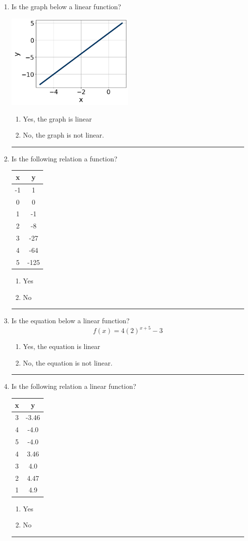 \documentclass[14pt]{extbook}
\newcommand{\litem}[1]{\item#1\hspace*{-1cm}\rule{\textwidth}{0.4pt}}
\begin{document}
\begin{enumerate}
{\begin{enumerate}[label=\Alph*.]
\end{enumerate} }
\litem{
Is the graph below a linear function?
\begin{center}
    \includegraphics[width=0.5\textwidth]{../Figures/MA_8_F_1_2_graphC.png}
\end{center}
\begin{enumerate}[label=\Alph*.]
\item Yes, the graph is linear
\item No, the graph is not linear.

\end{enumerate} }
\litem{
Is the following relation a function?

\begin{tabular}{c|c}
x &y\tabularnewline \hline
-1 &1\tabularnewline \hline
0 &0\tabularnewline \hline
1 &-1\tabularnewline \hline
2 &-8\tabularnewline \hline
3 &-27\tabularnewline \hline
4 &-64\tabularnewline \hline
5 &-125\end{tabular}\begin{enumerate}[label=\Alph*.]
\item Yes
\item No

\end{enumerate} }
\litem{
Is the equation below a linear function?\[ f(x) = 4 (2)^{x + 5}-3 \]\begin{enumerate}[label=\Alph*.]
\item Yes, the equation is linear
\item No, the equation is not linear.

\end{enumerate} }
\litem{
Is the following relation a linear function?

\begin{tabular}{c|c}
x &y\tabularnewline \hline
3 &-3.46\tabularnewline \hline
4 &-4.0\tabularnewline \hline
5 &-4.0\tabularnewline \hline
4 &3.46\tabularnewline \hline
3 &4.0\tabularnewline \hline
2 &4.47\tabularnewline \hline
1 &4.9\end{tabular}\begin{enumerate}[label=\Alph*.]
\item Yes
\item No


\end{enumerate}}
\end{enumerate}
\end{document}
